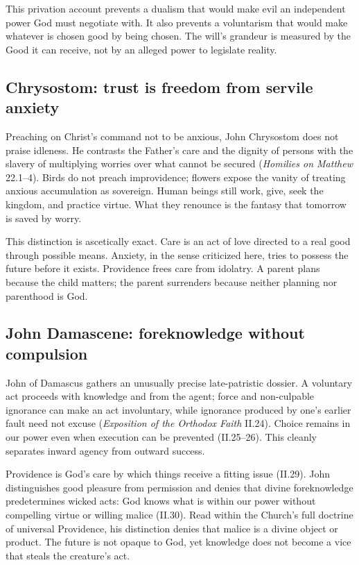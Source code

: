 This privation account prevents a dualism that would make evil an independent power God must negotiate with. It also prevents a voluntarism that would make whatever is chosen good by being chosen. The will's grandeur is measured by the Good it can receive, not by an alleged power to legislate reality.

\subsection{Chrysostom: trust is freedom from servile anxiety}

Preaching on Christ's command not to be anxious, John Chrysostom does not praise idleness. He contrasts the Father's care and the dignity of persons with the slavery of multiplying worries over what cannot be secured (\emph{Homilies on Matthew} 22.1--4). Birds do not preach improvidence; flowers expose the vanity of treating anxious accumulation as sovereign. Human beings still work, give, seek the kingdom, and practice virtue. What they renounce is the fantasy that tomorrow is saved by worry.

This distinction is ascetically exact. Care is an act of love directed to a real good through possible means. Anxiety, in the sense criticized here, tries to possess the future before it exists. Providence frees care from idolatry. A parent plans because the child matters; the parent surrenders because neither planning nor parenthood is God.

\subsection{John Damascene: foreknowledge without compulsion}

John of Damascus gathers an unusually precise late-patristic dossier. A voluntary act proceeds with knowledge and from the agent; force and non-culpable ignorance can make an act involuntary, while ignorance produced by one's earlier fault need not excuse (\emph{Exposition of the Orthodox Faith} II.24). Choice remains in our power even when execution can be prevented (II.25--26). This cleanly separates inward agency from outward success.

Providence is God's care by which things receive a fitting issue (II.29). John distinguishes good pleasure from permission and denies that divine foreknowledge predetermines wicked acts: God knows what is within our power without compelling virtue or willing malice (II.30). Read within the Church's full doctrine of universal Providence, his distinction denies that malice is a divine object or product. The future is not opaque to God, yet knowledge does not become a vice that steals the creature's act.

